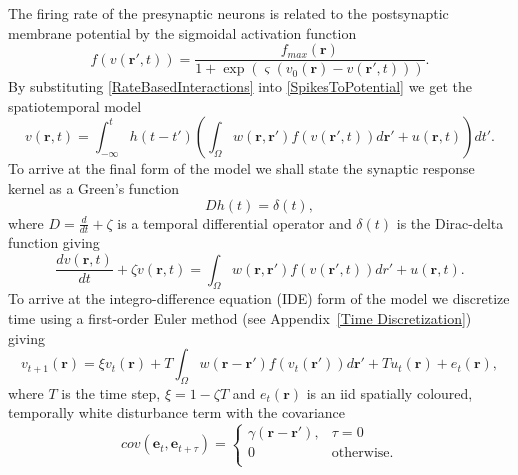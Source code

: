 \documentclass[12pt]{iopart}		%
\begin{document}
The firing rate of the presynaptic neurons is related to the postsynaptic membrane potential by the sigmoidal activation function
\begin{equation}\label{ActivationFunction}
	f\left( v\left( \mathbf{r}', t \right) \right) = \frac{f_{max}\left(\mathbf{r}\right)}{1 + \exp \left( \varsigma \left( v_0\left( \mathbf{r} \right) - v\left(\mathbf{r}',t\right) \right) \right)}.
\end{equation}
By substituting \ref{RateBasedInteractions} into \ref{SpikesToPotential}  we get the spatiotemporal model
\begin{equation}\label{FullDoubleIntModel}
	v\left(\mathbf{r},t\right) = \int_{-\infty}^t h\left(t - t'\right) \left(\int_\Omega   w\left(\mathbf{r},\mathbf{r}'\right) f\left( v\left( \mathbf{r}',t \right)\right)d\mathbf{r}' + u(\mathbf{r},t) \right)dt'.
\end{equation}
To arrive at the final form of the model we shall state the synaptic response kernel as a Green's function
\begin{equation}\label{GreensFuncDef}
	Dh\left( t \right) = \delta \left( t \right),
\end{equation}
where $D=\frac{d}{dt} + \zeta$ is a temporal differential operator and $\delta(t)$ is the Dirac-delta function giving 
\begin{equation}\label{FinalFormContinuous}
	\frac{dv\left( \mathbf{r},t \right)}{dt} + \zeta v\left( \mathbf{r},t \right) = \int_\Omega  {w\left( \mathbf{r},\mathbf{r}' \right)f\left( {v\left( \mathbf{r}',t \right)} \right)dr'} + u\left(\mathbf{r},t\right).
\end{equation}
To arrive at the integro-difference equation (IDE) form of the model we discretize time using a first-order Euler method (see Appendix~\ref{Time Discretization}) giving
\begin{equation}\label{DiscreteTimeModel}
	v_{t+1}\left(\mathbf{r}\right) = \xi v_t\left(\mathbf{r}\right) + T \int_\Omega { w\left(\mathbf{r}-\mathbf{r}'\right) f\left(v_t\left(\mathbf{r}'\right)\right) d\mathbf{r}'} + T u_t\left(\mathbf{r}\right) + e_t\left(\mathbf{r}\right),
\end{equation} 
where $T$ is the time step, $\xi = 1-\zeta T$ and $e_t\left(\mathbf{r}\right)$ is an iid spatially coloured, temporally white disturbance term with the covariance 
\begin{equation}
    cov(\mathbf{e}_t,\mathbf{e}_{t+\tau}) = \left\{ \begin{array}{*{20}{c}}
    \gamma\left(\mathbf{r}-\mathbf{r'}\right), & \tau=0 \\
    0 & \mathrm{otherwise}. \\
    \end{array} \right.
\end{equation}
\end{document}
